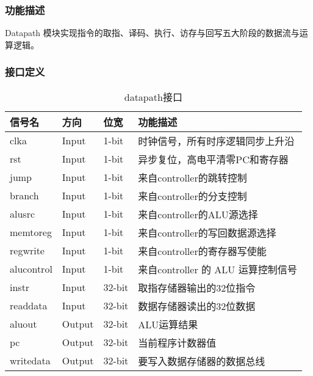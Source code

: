 \subsubsection{功能描述}
Datapath 模块实现指令的取指、译码、执行、访存与回写五大阶段的数据流与运算逻辑。
\subsubsection{接口定义}
\begin{table}[H]
\caption{datapath接口}\label{tab:datapath接口}
\begin{center}
	\begin{tabular}{|l|l|l|p{6cm}|}
	\hline
	\textbf{信号名} & \textbf{方向} & \textbf{位宽} & \textbf{功能描述}\\ \hline \hline
	clka			& Input& 1-bit & 时钟信号，所有时序逻辑同步上升沿\\
	rst&Input&1-bit&异步复位，高电平清零PC和寄存器\\
	jump&Input&1-bit&来自controller的跳转控制\\
	branch&Input&1-bit&来自controller的分支控制\\
	alusrc&Input&1-bit&来自controller的ALU源选择\\
	memtoreg&Input&1-bit&来自controller的写回数据源选择\\
	regwrite&Input&1-bit&来自controller的寄存器写使能\\
	alucontrol&Input&1-bit&来自controller 的 ALU 运算控制信号\\
	instr&Input&32-bit&取指存储器输出的32位指令\\
	readdata&Input&32-bit&数据存储器读出的32位数据\\
	aluout&Output&32-bit&ALU运算结果\\
	pc&Output&32-bit&当前程序计数器值\\
	writedata&Output&32-bit&要写入数据存储器的数据总线\\
	\hline
	\end{tabular}
\end{center}
\end{table}